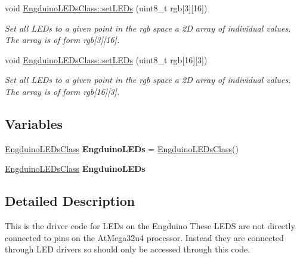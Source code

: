\begin{DoxyCompactItemize}
void \hyperlink{group___engduino_l_e_ds_ga0a9653a83047056363d0fca5628ed0c9}{Engduino\+L\+E\+Ds\+Class\+::set\+L\+E\+Ds} (uint8\+\_\+t rgb\mbox{[}3\mbox{]}\mbox{[}16\mbox{]})
\begin{DoxyCompactList}\small\item\em Set all L\+E\+Ds to a given point in the rgb space a 2\+D array of individual values. The array is of form rgb\mbox{[}3\mbox{]}\mbox{[}16\mbox{]}. \end{DoxyCompactList}\item 
void \hyperlink{group___engduino_l_e_ds_ga41d42e2b694c6a1de7e0e53d9b85c2bb}{Engduino\+L\+E\+Ds\+Class\+::set\+L\+E\+Ds} (uint8\+\_\+t rgb\mbox{[}16\mbox{]}\mbox{[}3\mbox{]})
\begin{DoxyCompactList}\small\item\em Set all L\+E\+Ds to a given point in the rgb space a 2\+D array of individual values. The array is of form rgb\mbox{[}16\mbox{]}\mbox{[}3\mbox{]}. \end{DoxyCompactList}\end{DoxyCompactItemize}
\subsection*{Variables}
\begin{DoxyCompactItemize}
\item 
\hypertarget{group___engduino_l_e_ds_ga3d4bf6230e99543620a37c5f311a7121}{}\hyperlink{class_engduino_l_e_ds_class}{Engduino\+L\+E\+Ds\+Class} {\bfseries Engduino\+L\+E\+Ds} = \hyperlink{class_engduino_l_e_ds_class}{Engduino\+L\+E\+Ds\+Class}()\label{group___engduino_l_e_ds_ga3d4bf6230e99543620a37c5f311a7121}

\item 
\hypertarget{group___engduino_l_e_ds_ga3d4bf6230e99543620a37c5f311a7121}{}\hyperlink{class_engduino_l_e_ds_class}{Engduino\+L\+E\+Ds\+Class} {\bfseries Engduino\+L\+E\+Ds}\label{group___engduino_l_e_ds_ga3d4bf6230e99543620a37c5f311a7121}

\end{DoxyCompactItemize}


\subsection{Detailed Description}
This is the driver code for L\+E\+Ds on the Engduino These L\+E\+D\+S are not directly connected to pins on the At\+Mega32u4 processor. Instead they are connected through L\+E\+D drivers so should only be accessed through this code.

